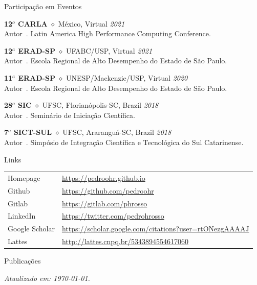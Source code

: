 \documentclass[a4paper]{resume}
\begin{document}
\begin{rSection}{Participação em Eventos}


{\bf 12$^o$ CARLA} $\diamond$ México, Virtual \hfill {\em 2021} \\
Autor~\cite{carla2021}. Latin America High Performance Computing Conference.

{\bf 12$^a$ ERAD-SP} $\diamond$ UFABC/USP, Virtual \hfill {\em 2021} \\
Autor~\cite{erad2021}. Escola Regional de Alto Desempenho do Estado de São Paulo.

{\bf 11$^a$ ERAD-SP} $\diamond$ UNESP/Mackenzie/USP, Virtual \hfill {\em 2020} \\
Autor~\cite{erad2020}. Escola Regional de Alto Desempenho do Estado de São Paulo.

{\bf 28$^o$ SIC} $\diamond$ UFSC, Florianópolis-SC, Brazil \hfill {\em 2018} \\
Autor~\cite{pibic}. Seminário de Iniciação Científica.

{\bf 7$^o$ SICT-SUL} $\diamond$ UFSC, Araranguá-SC, Brazil \hfill {\em 2018} \\
Autor~\cite{pibic}. Simpósio de Integração Científica e Tecnológica do Sul Catarinense.

\end{rSection}
\newpage
\begin{rSection}{Links}
  \begin{tabular}{ll}
    Homepage       & \url{https://pedroohr.github.io} \\
    Github         & \url{https://github.com/pedroohr} \\
    Gitlab         & \url{https://gitlab.com/phrosso} \\
    LinkedIn       & \url{https://twitter.com/pedrohrosso} \\
    Google Scholar & \url{https://scholar.google.com/citations?user=rtONezgAAAAJ} \\
    Lattes         & \url{http://lattes.cnpq.br/5343894554617060} \\
  \end{tabular}
\end{rSection}

\begin{rSection}{Publicações}
\renewcommand{\section}[2]{}


\end{rSection}

\vfill \hfill {\em Atualizado em: \today.}
\end{document}
